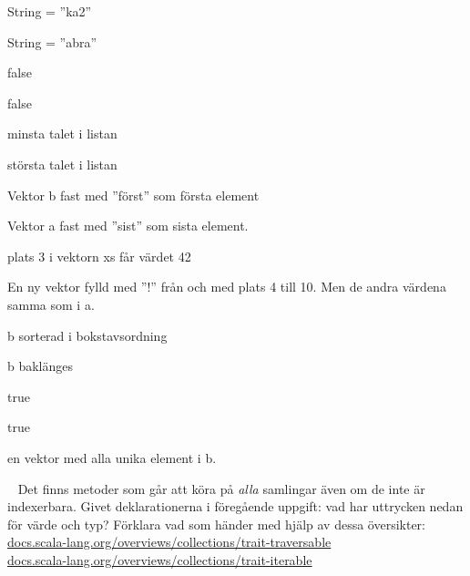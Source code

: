 \Subtask {}

\Subtask {}

\Subtask {}

\Subtask {}

\Subtask {}



\SOLUTION


\TaskSolved \what


\SubtaskSolved   String = ''ka2''

\SubtaskSolved   String = ''abra''

\SubtaskSolved   false

\SubtaskSolved   false



\SubtaskSolved   minsta talet i listan

\SubtaskSolved   största talet i listan



\SubtaskSolved   Vektor b fast med ''först'' som första element

\SubtaskSolved   Vektor a fast med ''sist'' som sista element.

\SubtaskSolved   plats 3 i vektorn xs får värdet 42

\SubtaskSolved   En ny vektor fylld med ''!'' från och med plats 4 till 10. Men de andra värdena samma som i a.

\SubtaskSolved   b sorterad i bokstavsordning

\SubtaskSolved   b baklänges

\SubtaskSolved   true

\SubtaskSolved   true

\SubtaskSolved   en vektor med alla unika element i b.


\QUESTEND









\QUESTBEGIN

\Task  \what~  Det finns metoder som går att köra på \emph{alla} samlingar även om de inte är indexerbara. Givet deklarationerna i föregående uppgift: vad har uttrycken nedan för värde och typ? Förklara vad som händer med hjälp av dessa översikter: \\ \href{http://docs.scala-lang.org/overviews/collections/trait-traversable}{docs.scala-lang.org/overviews/collections/trait-traversable} \\ \href{http://docs.scala-lang.org/overviews/collections/trait-iterable}{docs.scala-lang.org/overviews/collections/trait-iterable}

